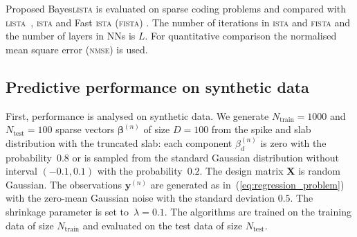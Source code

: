 \documentclass{article}
\begin{document}
  Proposed Bayes\textsc{lista} is evaluated on sparse coding problems and compared with \textsc{lista}~\cite{gregor2010learning}, \textsc{ista} \cite{daubechies2004iterative} and Fast \textsc{ista} (\textsc{fista}) \cite{beck2009fast}. The number of iterations in \textsc{ista} and \textsc{fista}  and the number of layers in NNs is $L$. For quantitative comparison the normalised mean square error (\textsc{nmse}) is used. %
  
  \subsection{Predictive performance on synthetic data}
  First, performance is analysed on synthetic data. We generate $N_\text{train}=1000$ and $N_{\text{test}} = 100$ sparse vectors $\boldsymbol\beta^{(n)}$ of size $D = 100$  from the spike and slab distribution with the truncated slab: each component $\beta^{(n)}_{d}$ is zero with the probability~$0.8$ or is sampled from the standard Gaussian distribution without interval $(-0.1, 0.1)$ with the probability~$0.2$. The design matrix $\mathbf{X}$ is random Gaussian.  The observations $\mathbf{y}^{(n)}$ are generated as in~(\ref{eq:regression_problem}) with the zero-mean Gaussian noise with the standard deviation $0.5$. The shrinkage parameter is set to~$\lambda = 0.1$. The algorithms are trained on the training data of size $N_\text{train}$ and evaluated on the test data of size $N_{\text{test}}$.
  
\end{document}
